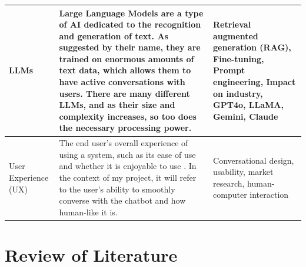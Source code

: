 \documentclass[12pt]{report}
\begin{document}
\begin{table}[H]
\begin{tabular}{|p{}|p{} | p{}|}
            \hline
            
            LLMs & Large Language Models are a type of AI dedicated to the recognition and generation of text.
            As suggested by their name, they are trained on enormous amounts of text data, which allows them 
            to have active conversations with users. There are many different LLMs, and as their size and 
            complexity increases, so too does the necessary processing power. &
            Retrieval augmented generation (RAG), Fine-tuning, Prompt engineering, Impact on industry,
            GPT4o, LLaMA, Gemini, Claude
            
            \\

            \hline

            User Experience (UX) & The end user's overall experience of using a system, such as its ease of use and 
            whether it is enjoyable to use \autocite{UXDict}. In the context of my project, it will refer to the user's 
            ability to smoothly converse with the chatbot and how human-like it is. 
            & Conversational design, usability, market research, human-computer interaction

            \\

            \hline 

        \end{tabular}\label{tab:themes}
    \end{table}


    \pagebreak %

    \section{Review of Literature}

\end{document}
